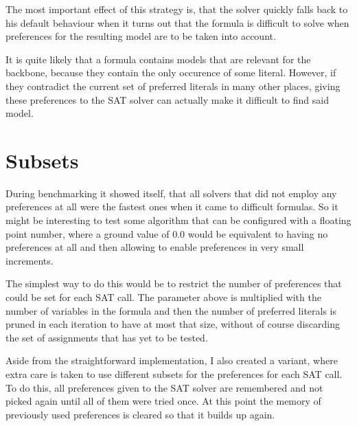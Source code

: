The most important effect of this strategy is, that the solver quickly falls back to his default behaviour when it turns out that the formula is difficult to solve when preferences for the resulting model are to be taken into account. 

It is quite likely that a formula contains models that are relevant for the backbone, because they contain the only occurence of some literal. However, if they contradict the current set of preferred literals in many other places, giving these preferences to the SAT solver can actually make it difficult to find said model.

\section{Subsets}
\label{sec:subsets}
During benchmarking it showed itself, that all solvers that did not employ any preferences at all were the fastest ones when it came to difficult formulas. So it might be interesting to test some algorithm that can be configured with a floating point number, where a ground value of $0.0$ would be equivalent to having no preferences at all and then allowing to enable preferences in very small increments.

The simplest way to do this would be to restrict the number of preferences that could be set for each SAT call. The parameter above is multiplied with the number of variables in the formula and then the number of preferred literals is pruned in each iteration to have at most that size, without of course discarding the set of assignments that has yet to be tested.

Aside from the straightforward implementation, I also created a variant, where extra care is taken to use different subsets for the preferences for each SAT call. To do this, all preferences given to the SAT solver are remembered and not picked again until all of them were tried once. At this point the memory of previously used preferences is cleared so that it builds up again.





